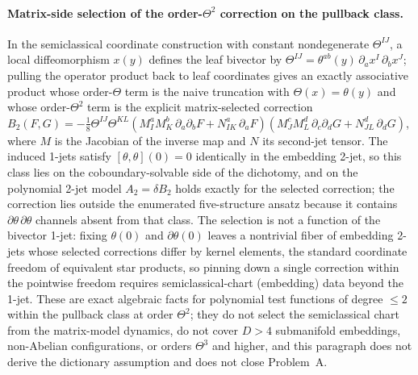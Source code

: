 \paragraph{Matrix-side selection of the order-\(\Theta^2\) correction on the pullback class.} In the semiclassical coordinate construction with constant nondegenerate \(\Theta^{IJ}\), a local diffeomorphism \(x(y)\) defines the leaf bivector by \(\Theta^{IJ}=\theta^{ab}(y)\,\partial_ax^I\,\partial_bx^J\); pulling the operator product back to leaf coordinates gives an exactly associative product whose order-\(\Theta\) term is the naive truncation with \(\Theta(x)=\theta(y)\) and whose order-\(\Theta^2\) term is the explicit matrix-selected correction \(B_2(F,G)=-\tfrac{1}{8}\Theta^{IJ}\Theta^{KL}(M^a_IM^b_K\,\partial_a\partial_bF+N^a_{IK}\,\partial_aF)(M^c_JM^d_L\,\partial_c\partial_dG+N^d_{JL}\,\partial_dG)\), where \(M\) is the Jacobian of the inverse map and \(N\) its second-jet tensor. The induced 1-jets satisfy \([\theta,\theta](0)=0\) identically in the embedding 2-jet, so this class lies on the coboundary-solvable side of the dichotomy, and on the polynomial 2-jet model \(A_2=\delta B_2\) holds exactly for the selected correction; the correction lies outside the enumerated five-structure ansatz because it contains \(\partial\theta\,\partial\theta\) channels absent from that class. The selection is not a function of the bivector 1-jet: fixing \(\theta(0)\) and \(\partial\theta(0)\) leaves a nontrivial fiber of embedding 2-jets whose selected corrections differ by kernel elements, the standard coordinate freedom of equivalent star products, so pinning down a single correction within the pointwise freedom requires semiclassical-chart (embedding) data beyond the 1-jet. These are exact algebraic facts for polynomial test functions of degree \(\le2\) within the pullback class at order \(\Theta^2\); they do not select the semiclassical chart from the matrix-model dynamics, do not cover \(D>4\) submanifold embeddings, non-Abelian configurations, or orders \(\Theta^3\) and higher, and this paragraph does not derive the dictionary assumption and does not close Problem~A.

